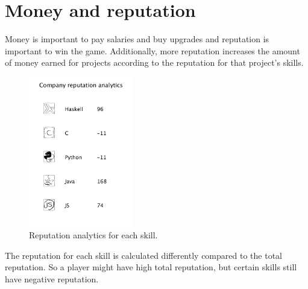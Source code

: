 \documentclass[11pt]{article}
\begin{document}
\section{Money and reputation}
Money is important to pay salaries and buy upgrades and reputation is important to win the game. Additionally, more reputation increases the amount of money earned for projects according to the reputation for that project's skills. 
\begin{figure}[H]
\centering
\includegraphics[width=0.4\textwidth, keepaspectratio]{imgs/reputation.png}
\caption{Reputation analytics for each skill.}
\end{figure}
\noindent
The reputation for each skill is calculated differently compared to the total reputation. So a player might have high total reputation, but certain skills still have negative reputation. 
\end{document}
